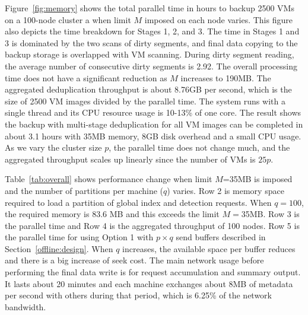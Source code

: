 Figure~\ref{fig:memory} shows the total parallel time in hours to backup 2500 VMs on
 a 100-node cluster a  when
limit $M$ imposed on each node varies.
This figure also depicts the time breakdown for Stages 1, 2, and 3.
The time in Stages 1 and 3  is  dominated by  the two scans of dirty segments,
and final data copying to the backup storage is overlapped with VM scanning.
During dirty segment reading, the average number of consecutive dirty segments is 2.92.
The overall processing time does not have a significant reduction as $M$ increases to 190MB.
The aggregated deduplication throughput is  about 8.76GB per second,
which is the size of 2500 VM images divided by the parallel time.
The system runs with  a single thread and  its CPU resource usage is 10-13\% of one core.
The result shows the backup with multi-stage deduplication  for all VM images can be
completed in about 3.1 hours with 35MB memory,  8GB disk overhead and a small CPU usage.
As we vary the cluster size $p$,  the parallel time does  not change much, and  the aggregated throughput
scales up linearly since the number of VMs is  $25p$.

Table~\ref{tab:overall} shows performance change when limit $M$=35MB is imposed and
the number of partitions per machine ($q$) varies.
Row 2 is memory space required to load a partition of global index and detection requests.
When $q=100$, the required memory is 83.6 MB and this exceeds the limit $M=$35MB.
Row 3 is the parallel time and Row 4 is  the aggregated throughput of  100 nodes.
Row 5 is  the parallel time for using Option 1 with $p\times q$ send buffers
described in Section~\ref{offline:design}.
When $q$ increases, the available space per buffer reduces and there is a big increase of seek cost.
The main network usage before performing the final data write is for request accumulation and
summary output. It lasts about 20 minutes and each machine exchanges
about   8MB of metadata per second with others during that period, which is 6.25\% of the network bandwidth.

